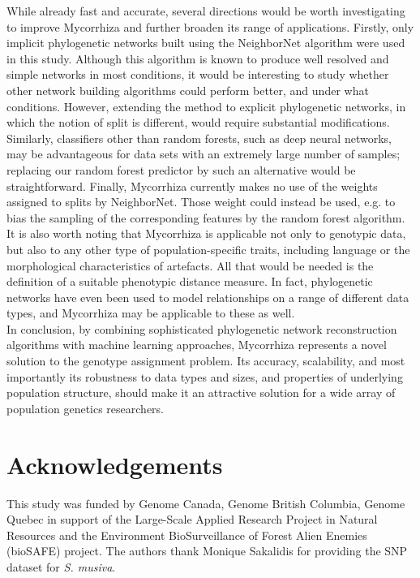 \documentclass[final]{bioinfo}
\begin{document}
While already fast and accurate, several directions would be worth investigating to improve Mycorrhiza and further broaden its range of applications. Firstly, only implicit phylogenetic networks built using the NeighborNet algorithm were used in this study. Although this algorithm is known to produce well resolved and simple networks in most conditions, it would be interesting to study whether other network building algorithms could perform better, and under what conditions. However, extending the method to explicit phylogenetic networks, in which the notion of split is different, would require substantial modifications. Similarly, classifiers other than random forests, such as deep neural networks, may be advantageous for data sets with an extremely large number of samples; replacing our random forest predictor by such an alternative would be straightforward. Finally, Mycorrhiza currently makes no use of the weights assigned to splits by NeighborNet. Those weight could instead be used, e.g. to bias the sampling of the corresponding features by the random forest algorithm.\\ 
It is also worth noting that Mycorrhiza is applicable not only to genotypic data, but also to any other type of population-specific traits, including language or the morphological characteristics of artefacts. All that would be needed is the definition of a suitable phenotypic distance measure. In fact, phylogenetic networks have even been used to model relationships on a range of different data types, and Mycorrhiza may be applicable to these as well.\\
In conclusion, by combining sophisticated phylogenetic network reconstruction algorithms with machine learning approaches, Mycorrhiza represents a novel solution to the genotype assignment problem. Its accuracy, scalability, and most importantly its robustness to data types and sizes, and properties of underlying population structure, should make it an attractive solution for a wide array of population genetics researchers.
\section*{Acknowledgements}
This study was funded by Genome Canada, Genome British Columbia, Genome Quebec in support of the Large-Scale Applied Research Project in Natural Resources and the Environment BioSurveillance of Forest Alien Enemies (bioSAFE) project. The authors thank Monique Sakalidis for providing the SNP dataset for \textit{S. musiva}.
\end{document}
